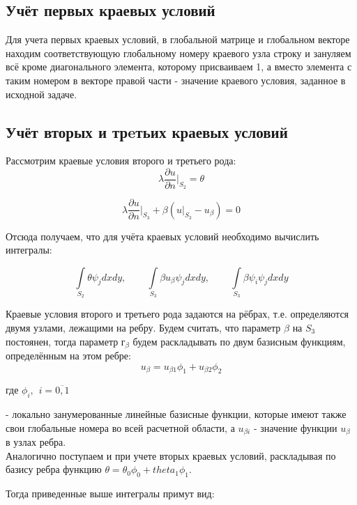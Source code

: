 \documentclass[12pt,a4paper]{article}
\begin{document}
\subsection*{Учёт первых краевых условий}

Для учета первых краевых условий, в глобальной матрице
и глобальном векторе находим соответствующую глобальному
номеру краевого узла строку и зануляем всё кроме
диагонального элемента, которому присваиваем 1, а вместо
элемента с таким номером в векторе правой части - значение
краевого условия, заданное в исходной задаче.


\subsection*{Учёт вторых и трeтьих краевых условий}

Рассмотрим краевые условия второго и третьего рода:
$$
    \lambda \frac{\partial u}{\partial n}
    \bigg\vert_{S_2} = \theta
$$

$$
    \lambda \frac{\partial u}{\partial n}
    \bigg\vert_{S_3} +
    \beta(u \vert_{S_3} - u_{\beta}) = 0
$$

\noindent Отсюда получаем, что для учёта краевых условий
необходимо вычислить интегралы:

$$
    \int \limits_{S_2} \theta \psi_j dxdy,          \hspace{25pt}
    \int \limits_{S_3} \beta u_{\beta} \psi_j dxdy, \hspace{25pt}
    \int \limits_{S_3} \beta \psi_i \psi_j dxdy
$$

\noindent Краевые условия второго и третьего рода задаются
на рёбрах, т.е. определяются двумя узлами, лежащими на
ребру. Будем считать, что параметр $\beta$ на $S_3$
постоянен, тогда параметр $г_{\beta}$ будем
раскладывать по двум базисным функциям,
определённым на этом ребре:
$$ u_{\beta} = u_{\beta 1} \phi_1 + u_{\beta 2} \phi_2 $$

\noindent где $\phi_i, \hspace{5pt} i=\overline{0,1}$

- локально занумерованные линейные базисные функции,
которые имеют также свои глобальные номера во всей
расчетной области, а $u_{\beta i}$ - значение функции
$u_{\beta}$ в узлах ребра. \\

\noindent Аналогично поступаем и при учете вторых
краевых условий, раскладывая по базису ребра функцию
$\theta = \theta_0 \phi_0 + theta_1 \phi_1$.

\noindent Тогда приведенные выше интегралы примут вид:
\end{document}
